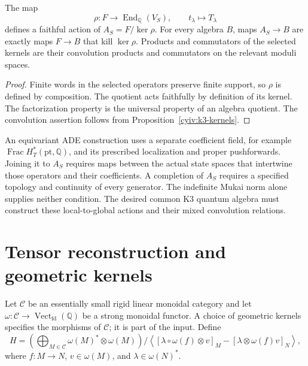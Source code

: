 \begin{proposition}\label{cyiv:k3-action}
The map
\[
 \rho:F\longrightarrow\operatorname{End}_{\mathbb Q}(V_S),
 \qquad t_\lambda\longmapsto T_\lambda
\]
defines a faithful action of $A_S=F/\ker\rho$.
For every algebra $B$, maps $A_S\to B$ are exactly maps $F\to B$
that kill $\ker\rho$.
Products and commutators of the selected kernels are their convolution
products and commutators on the relevant moduli spaces.
\end{proposition}
\begin{proof}
Finite words in the selected operators preserve finite support, so
$\rho$ is defined by composition.
The quotient acts faithfully by definition of its kernel.
The factorization property is the universal property of an algebra
quotient.
The convolution assertion follows from Proposition~\ref{cyiv:k3-kernels}.
\end{proof}

An equivariant ADE construction uses a separate coefficient field,
for example $\operatorname{Frac}H_T^*(\mathrm{pt},\mathbb Q)$,
and its prescribed localization and proper pushforwards.
Joining it to $A_S$ requires maps between the actual state spaces that
intertwine those operators and their coefficients.
A completion of $A_S$ requires a specified topology and continuity of
every generator.
The indefinite Mukai norm alone supplies neither condition.
The desired common K3 quantum algebra must construct these local-to-global
actions and their mixed convolution relations.

\chapter{Tensor reconstruction and geometric kernels}
Let $\mathscr C$ be an essentially small rigid linear monoidal category
and let $\omega:\mathscr C\to\operatorname{Vect}_{\mathrm{fd}}(\mathbb Q)$
be a strong monoidal functor.
A choice of geometric kernels specifies the morphisms of $\mathscr C$;
it is part of the input.
Define
\[
 H=\left(\bigoplus_{M\in\mathscr C}\omega(M)^*\otimes\omega(M)\right)
 \big/\left\langle
 [\lambda\circ\omega(f)\otimes v]_M
 -[\lambda\otimes\omega(f)v]_N\right\rangle,
\]
where $f:M\to N$, $v\in\omega(M)$, and $\lambda\in\omega(N)^*$.

